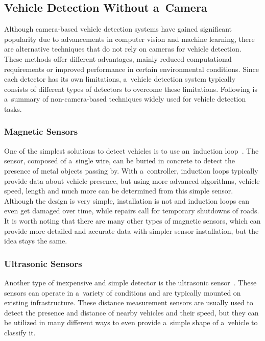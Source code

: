 \subsection{Vehicle Detection Without a~Camera}

Although camera-based vehicle detection systems have gained significant
popularity due to advancements in computer vision and machine learning, there
are alternative techniques that do not rely on cameras for vehicle detection.
These methods offer different advantages, mainly reduced computational
requirements or improved performance in certain environmental conditions. Since
each detector has its own limitations, a~vehicle detection system typically
consists of different types of detectors to overcome these limitations.
Following is a~summary of non-camera-based techniques widely used for vehicle
detection tasks.


\subsubsection*{Magnetic Sensors}

One of the simplest solutions to detect vehicles is to use an~induction
loop~\cite{MagneticSensors}. The sensor, composed of a~single wire, can be buried
in concrete to detect the presence of metal objects passing by. With
a~controller, induction loops typically provide data about vehicle presence, but
using more advanced algorithms, vehicle speed, length and much more
can be determined from this simple sensor. Although the design is very simple,
installation is not and induction loops can even get damaged over time, while
repairs call for temporary shutdowns of roads. It is worth noting that there
are many other types of magnetic sensors, which can provide more detailed and
accurate data with simpler sensor installation, but the idea stays the same.


\subsubsection*{Ultrasonic Sensors}

Another type of inexpensive and simple detector is the ultrasonic
sensor~\cite{UltrasonicSensors}. These sensors can operate in a~variety of
conditions and are typically mounted on existing infrastructure. These distance
measurement sensors are usually used to detect the presence and distance of nearby
vehicles and their speed, but they can be utilized in many different ways to
even provide a~simple shape of a~vehicle to classify it.


